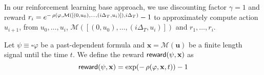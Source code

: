 In our reinforcement learning base approach, we use discounting factor $\gamma=1$ and reward $r_i = e^{- \operatorname{\rho}(\varphi, \mathcal{M}(\left[(0, u_0), \ldots, (i\Delta_T, u_i)\right]), i\Delta_T)} - 1$  to approximately compute action $u_{i+1}$, from $u_0, \ldots, u_i$, $\mathcal{M}(\left[(0, u_0), \ldots, (i\Delta_T, u_i) \right])$ and $r_1, \ldots, r_i$.

\begin{definition}[reward]\label{def:reward}
  Let $\psi \equiv \square \varphi$ be a past-dependent formula
  and $\mathbf{x} = \mathcal{M}(\mathbf{u})$ be a finite length signal until the time $t$.
  We define the reward $\operatorname{\mathsf{reward}}(\psi, \mathbf{x})$ as
  \begin{equation}\label{eq:reward}
    \operatorname{\mathsf{reward}}(\psi, \mathbf{x}) =
      \exp(- \operatorname{\rho}(\varphi, \mathbf{x}, t)) - 1
  \end{equation}
\end{definition}

